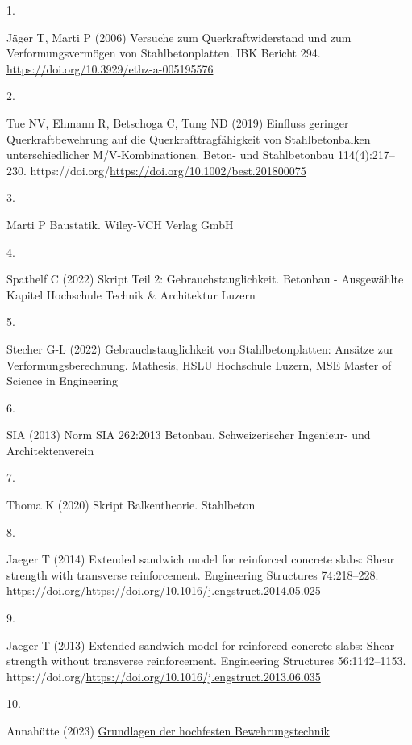 \documentclass[
  12pt,
  letterpaper,
  egregdoesnotlikesansseriftitles]{scrreprt}
\newlength{\cslhangindent}
\newlength{\csllabelwidth}
\newenvironment{CSLReferences}[2] %
 {\begin{list}{}{%
  \setlength{\itemindent}{0pt}
  \setlength{\leftmargin}{0pt}
  \setlength{\parsep}{0pt}
  \ifodd #1
   \setlength{\leftmargin}{\cslhangindent}
   \setlength{\itemindent}{-1\cslhangindent}
  \fi
  \setlength{\itemsep}{#2\baselineskip}}}
 {\end{list}}
\newcommand{\CSLLeftMargin}[1]{\parbox[t]{\csllabelwidth}{\strut#1\strut}}
\newcommand{\CSLRightInline}[1]{\parbox[t]{\linewidth - \csllabelwidth}{\strut#1\strut}}
\begin{document}
\label{refs}
\begin{CSLReferences}{0}{1}
\CSLLeftMargin{1. }%
\CSLRightInline{Jäger T, Marti P (2006) Versuche zum
{Querkraftwiderstand} und zum {Verformungsvermögen} von
{Stahlbetonplatten}. IBK Bericht 294.
\url{https://doi.org/10.3929/ethz-a-005195576}}

\CSLLeftMargin{2. }%
\CSLRightInline{Tue NV, Ehmann R, Betschoga C, Tung ND (2019) Einfluss
geringer Querkraftbewehrung auf die Querkrafttragfähigkeit von
Stahlbetonbalken unterschiedlicher M/V-Kombinationen. Beton- und
Stahlbetonbau 114(4):217--230.
https://doi.org/\url{https://doi.org/10.1002/best.201800075}}

\CSLLeftMargin{3. }%
\CSLRightInline{Marti P Baustatik. Wiley-VCH Verlag GmbH}

\CSLLeftMargin{4. }%
\CSLRightInline{Spathelf C (2022) Skript Teil 2: Gebrauchstauglichkeit.
Betonbau - Ausgewählte Kapitel Hochschule Technik \& Architektur Luzern}

\CSLLeftMargin{5. }%
\CSLRightInline{Stecher G-L (2022) Gebrauchstauglichkeit von
Stahlbetonplatten: Ansätze zur Verformungsberechnung. Mathesis, HSLU
Hochschule Luzern, MSE Master of Science in Engineering}

\CSLLeftMargin{6. }%
\CSLRightInline{SIA (2013) Norm {SIA} 262:2013 {Betonbau}.
{Schweizerischer Ingenieur- und Architektenverein}}

\CSLLeftMargin{7. }%
\CSLRightInline{Thoma K (2020) Skript Balkentheorie. Stahlbeton}

\CSLLeftMargin{8. }%
\CSLRightInline{Jaeger T (2014) Extended sandwich model for reinforced
concrete slabs: Shear strength with transverse reinforcement.
Engineering Structures 74:218--228.
https://doi.org/\url{https://doi.org/10.1016/j.engstruct.2014.05.025}}

\CSLLeftMargin{9. }%
\CSLRightInline{Jaeger T (2013) Extended sandwich model for reinforced
concrete slabs: Shear strength without transverse reinforcement.
Engineering Structures 56:1142--1153.
https://doi.org/\url{https://doi.org/10.1016/j.engstruct.2013.06.035}}

\CSLLeftMargin{10. }%
\CSLRightInline{Annahütte (2023)
\href{https://www.annahuette.com/cdn/uploads/bro-sas-670-reinforcement-de-en-02-2016-web.pdf}{Grundlagen
der hochfesten Bewehrungstechnik}}

\end{CSLReferences}
\end{document}

